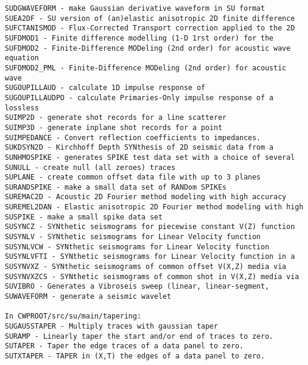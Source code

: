 {\begin{verbatim}
SUDGWAVEFORM - make Gaussian derivative waveform in SU format		
SUEA2DF - SU version of (an)elastic anisotropic 2D finite difference 	
SUFCTANISMOD - Flux-Corrected Transport correction applied to the 2D
SUFDMOD1 - Finite difference modelling (1-D 1rst order) for the	
SUFDMOD2 - Finite-Difference MODeling (2nd order) for acoustic wave equation
SUFDMOD2_PML - Finite-Difference MODeling (2nd order) for acoustic wave
SUGOUPILLAUD - calculate 1D impulse response of	 		
SUGOUPILLAUDPO - calculate Primaries-Only impulse response of a lossless
SUIMP2D - generate shot records for a line scatterer	
SUIMP3D - generate inplane shot records for a point 	
SUIMPEDANCE - Convert reflection coefficients to impedances.  
SUKDSYN2D - Kirchhoff Depth SYNthesis of 2D seismic data from a	
SUNHMOSPIKE - generates SPIKE test data set with a choice of several   
SUNULL - create null (all zeroes) traces	 		
SUPLANE - create common offset data file with up to 3 planes	
SURANDSPIKE - make a small data set of RANDom SPIKEs 		
SUREMAC2D - Acoustic 2D Fourier method modeling with high accuracy     
SUREMEL2DAN - Elastic anisotropic 2D Fourier method modeling with high 
SUSPIKE - make a small spike data set 			
SUSYNCZ - SYNthetic seismograms for piecewise constant V(Z) function	
SUSYNLV - SYNthetic seismograms for Linear Velocity function		
SUSYNLVCW - SYNthetic seismograms for Linear Velocity function	
SUSYNLVFTI - SYNthetic seismograms for Linear Velocity function in a  
SUSYNVXZ - SYNthetic seismograms of common offset V(X,Z) media via	
SUSYNVXZCS - SYNthetic seismograms of common shot in V(X,Z) media via	
SUVIBRO - Generates a Vibroseis sweep (linear, linear-segment,
SUWAVEFORM - generate a seismic wavelet				

In CWPROOT/src/su/main/tapering:
SUGAUSSTAPER - Multiply traces with gaussian taper		
SURAMP - Linearly taper the start and/or end of traces to zero.	
SUTAPER - Taper the edge traces of a data panel to zero.	
SUTXTAPER - TAPER in (X,T) the edges of a data panel to zero.	


\end{verbatim}}
